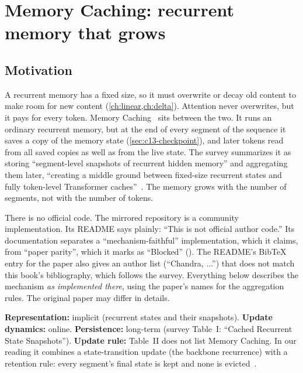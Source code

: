 \section{Memory Caching: recurrent memory that grows}\label{sec:c13-mc}

\subsection{Motivation}

A recurrent memory has a fixed size, so it must overwrite or decay old content to make room for new
content (\cref{ch:linear,ch:delta}). Attention never overwrites, but it pays for every token.
Memory Caching~\citep{behrouz2026memorycaching} sits between the two. It runs an ordinary recurrent
memory, but at the end of every segment of the sequence it saves a copy of the memory state
(\cref{sec:c13-checkpoint}), and later tokens read from all saved copies as well as from the live
state. The survey summarizes it as storing ``segment-level snapshots of recurrent hidden memory'' and
aggregating them later, ``creating a middle ground between fixed-size recurrent states and fully
token-level Transformer caches''~\citep{zhoubian2026memory}. The memory grows with the number of
segments, not with the number of tokens.

\begin{pitfall}[title={The code is unofficial}]
There is no official code. The mirrored repository  is a community
implementation. Its README says plainly: ``This is not official author code.'' Its documentation
separates a ``mechanism-faithful'' implementation, which it claims, from ``paper parity'', which it marks
as ``Blocked'' (). The README's
BibTeX entry for the paper also gives an author list (``Chandra, ...'') that does not match this book's
bibliography, which follows the survey. Everything below describes the mechanism \emph{as implemented
there}, using the paper's names for the aggregation rules. The original paper may differ in details.
\end{pitfall}

\begin{taxonomy}
\textbf{Representation:} implicit (recurrent states and their snapshots). \textbf{Update dynamics:}
online. \textbf{Persistence:} long-term (survey Table~I: ``Cached Recurrent State Snapshots'').
\textbf{Update rule:} Table~II does not list Memory Caching. In our reading it combines a state-transition
update (the backbone recurrence) with a retention rule: every segment's final state is kept and none
is evicted~\citep{zhoubian2026memory}.
\end{taxonomy}

